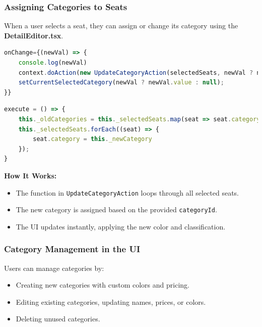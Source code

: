 \subsubsection{Assigning Categories to Seats}

When a user selects a seat, they can assign or change its category using the \textbf{DetailEditor.tsx}.

\begin{lstlisting}[language=TypeScript, caption=onChange Assigning Categories to Selected Seats, label=lst:assign-category]
onChange={(newVal) => {
    console.log(newVal)
    context.doAction(new UpdateCategoryAction(selectedSeats, newVal ? newVal.value : null))
    setCurrentSelectedCategory(newVal ? newVal.value : null);
}}
\end{lstlisting}

\begin{lstlisting}[language=TypeScript, caption=Assigning Categories to Selected Seats, label=lst:assign-category]
execute = () => {
    this._oldCategories = this._selectedSeats.map(seat => seat.category)
    this._selectedSeats.forEach((seat) => {
        seat.category = this._newCategory
    });
}
\end{lstlisting}

\textbf{How It Works:}
\begin{itemize}
    \item The function in \texttt{UpdateCategoryAction} loops through all selected seats.
    \item The new category is assigned based on the provided \texttt{categoryId}.
    \item The UI updates instantly, applying the new color and classification.
\end{itemize}

\subsubsection{Category Management in the UI}

Users can manage categories by:
\begin{itemize}
    \item Creating new categories with custom colors and pricing.
    \item Editing existing categories, updating names, prices, or colors.
    \item Deleting unused categories.
\end{itemize}

